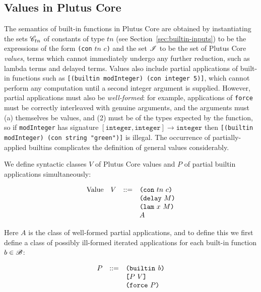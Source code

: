 \subsection{Values in Plutus Core}
\label{sec:uplc-values}
The semantics of
built-in functions in Plutus Core are obtained by instantiating the sets
$\mathscr{C}_{tn}$ of constants of type $tn$ (see Section~\ref{sec:builtin-inputs})
to be the expressions of the form \texttt{(con} $tn$ $c$\texttt{)} and the set
$\mathscr{I}$ to be the set of Plutus Core
\textit{values}, terms which cannot immediately undergo any further reduction,
such as lambda terms and delayed terms.
Values also include partial applications of built-in functions such as
\texttt{[(builtin modInteger) (con integer 5)]}, which cannot perform any
computation until a second integer argument is supplied.  However, partial
applications must also be \textit{well-formed}: for example, applications of
\texttt{force} must be correctly interleaved with genuine arguments, and the
arguments must (a) themselves be values, and (2) must be of the types expected
by the function, so if \texttt{modInteger} has signature $\mathtt{[integer,
    integer]} \rightarrow \mathtt{integer}$ then \texttt{[(builtin modInteger)
    (con string "green")]} is illegal.
%
The occurrence of partially-applied builtins complicates the definition of
general values considerably.

We define syntactic classes $V$ of Plutus Core values and $P$ of partial builtin
applications simultaneously:

\begin{minipage}{\linewidth}
    \centering
    \[\begin{array}{lrcl}
        \textrm{Value}  & V   & ::= & \texttt{(} \texttt{con} ~ tn ~ c \texttt{)} \\
                        &     &     & \texttt{(} \texttt{delay} ~ M \texttt{)} \\
                        &     &     & \texttt{(} \texttt{lam} ~ x ~ M  \texttt{)} \\
                        &     &     & A
    \end{array}\]
    \label{fig:untyped-cek-values}
\end{minipage}

\medskip
\noindent Here $A$ is the class of well-formed partial applications, and to define
this we first define a class of possibly ill-formed iterated applications for
each built-in function $b \in \mathscr{B}$:

\begin{minipage}{\linewidth}
    \centering
  \[\begin{array}{lrl}
  P & ::= & \texttt{(} \texttt{builtin} ~ \mathit{b} \texttt{)}\\
    &     & \texttt{[} P ~ V \texttt{]}\\
    &    & \texttt{(} \texttt{force} ~ P \texttt{)}\\
    \end{array}\]
    \label{fig:partial-applications}
\end{minipage}

